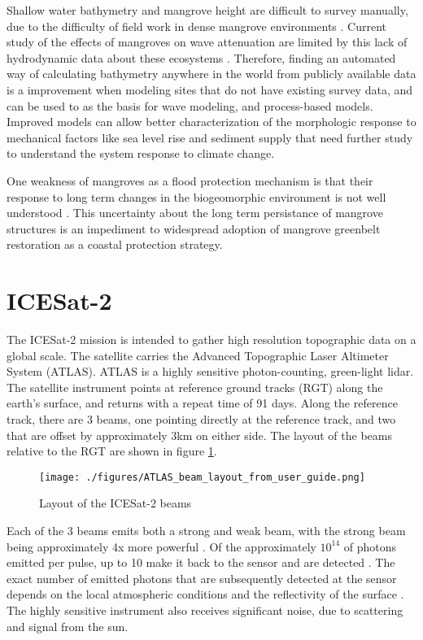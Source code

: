 Shallow water bathymetry and mangrove height are difficult to survey manually, due to the difficulty of field work in dense mangrove environments \parencite{Gijsman2021}. Current study of the effects of mangroves on wave attenuation are limited by this lack of hydrodynamic data about these ecosystems \parencite{Horstman2014}.  Therefore, finding an automated way of calculating bathymetry anywhere in the world from publicly available data is a improvement when modeling sites that do not have existing survey data, and can be used to as the basis for wave modeling, and process-based models. Improved models can allow better characterization of the morphologic response to mechanical factors like sea level rise and sediment supply that need further study to understand the system response to climate change.

One weakness of mangroves as a flood protection mechanism is that their response to long term changes in the biogeomorphic environment is not well understood \parencite{Gijsman2021}. This uncertainty about the long term persistance of mangrove structures is an impediment to widespread adoption of mangrove greenbelt restoration as a coastal protection strategy.

\section{ICESat-2}

The ICESat-2 mission is intended to gather high resolution topographic data on a global scale. The satellite carries the Advanced Topographic Laser Altimeter System (ATLAS). ATLAS is a highly sensitive photon-counting, green-light lidar. The satellite instrument points at reference ground tracks (RGT) along the earth's surface, and returns with a repeat time of 91 days. Along the reference track, there are 3 beams, one pointing directly at the reference track, and two that are offset by approximately 3km on either side. The layout of the beams relative to the RGT are shown in figure \ref{fig:icesat-rgts}.

\begin{figure}
      \centering
      \texttt{[image: ./figures/ATLAS\_beam\_layout\_from\_user\_guide.png]}
      \caption{Layout of the ICESat-2 beams}
      \label{fig:icesat-rgts}
\end{figure}

Each of the 3 beams emits both a strong and weak beam, with the strong beam being approximately 4x more powerful \parencite{Neumann2019d}. Of the approximately \(10^{14}\) of photons emitted per pulse, up to  10 make it back to the sensor and are detected \parencite{Neumann2019d}. The exact number of emitted photons that are subsequently detected at the sensor depends on the local atmospheric conditions and the reflectivity of the surface \parencite{Neumann2019e}. The highly sensitive instrument also receives significant noise, due to scattering and signal from the sun.

